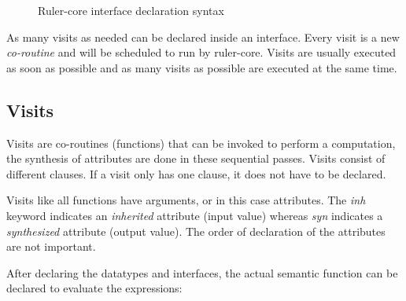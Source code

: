 \documentclass[twoside, titlepage, openright, a4paper]{book}
\newcommand{\Varid}[1]{\mathit{#1}}
\def\resethooks{%
  \global\let\SaveRestoreHook\empty
  \global\let\ColumnHook\empty}
\newcommand{\hsindent}[1]{\quad}%
\let\hspre\empty
\let\hspost\empty
\begin{document}
\begin{figure}[h!]
\resethooks
\caption{Ruler-core interface declaration syntax}
\label{itf:syntax}
\end{figure}

As many visits as needed can be declared inside an interface. Every visit is a new \emph{co-routine} and will be scheduled to run by ruler-core. Visits are usually executed as soon as possible and as many visits as possible are executed at the same time. %

\subsection{Visits}
Visits are co-routines (functions) that can be invoked to perform a computation, the synthesis of attributes are done in these sequential passes. Visits consist of different clauses. If a visit only has one clause, it does not have to be declared. 

Visits like all functions have arguments, or in this case attributes. The \emph{inh} keyword indicates an \emph{inherited} attribute (input value) whereas \emph{syn} indicates a \emph{synthesized} attribute (output value). The order of declaration of the attributes are not important.

After declaring the datatypes and interfaces, the actual semantic function can be declared to evaluate the expressions:
\end{document}
